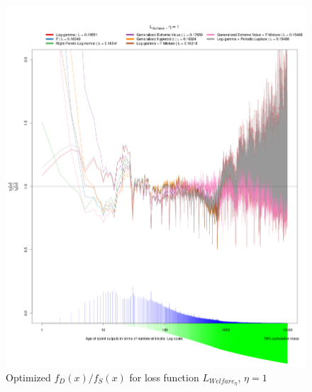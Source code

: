 \documentclass[english]{article}
\begin{document}
\begin{figure}
\caption{Optimized $f_{D}(x)/f_{S}(x)$ for loss function $L_{Welfare_{\eta}}$,
$\eta=1$}

\includegraphics[scale=0.35]{images/dry-run/estimate-div-target/estimate-div-target-L_Welfare-flavor-1}
\end{figure}
\end{document}
